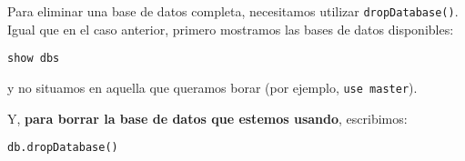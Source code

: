 \documentclass[]{article}
\begin{document}
Para eliminar una base de datos completa, necesitamos utilizar
\texttt{dropDatabase()}. Igual que en el caso anterior, primero
mostramos las bases de datos disponibles:

\begin{verbatim}
show dbs
\end{verbatim}

y no situamos en aquella que queramos borar (por ejemplo,
\texttt{use\ master}).

Y, \textbf{para borrar la base de datos que estemos usando}, escribimos:

\begin{verbatim}
db.dropDatabase()
\end{verbatim}
\end{document}
